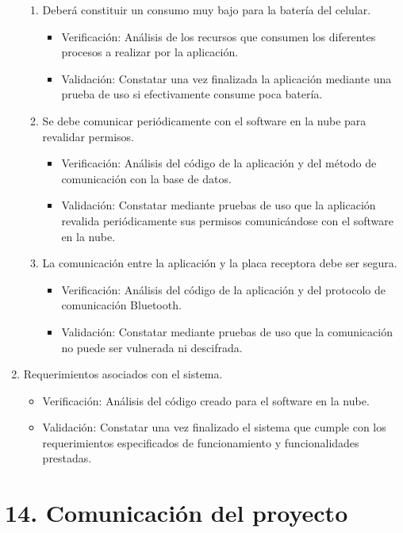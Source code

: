 \documentclass[11pt]{charter}
\begin{document}
\begin{enumerate}
\begin{enumerate}
	\item Deberá constituir un consumo muy bajo para la batería del celular.
		\begin{itemize}
		\item Verificación: Análisis de los recursos que consumen los diferentes procesos a realizar por la aplicación.
		\item Validación: Constatar una vez finalizada la aplicación mediante una prueba de uso si efectivamente consume poca batería.
		\end{itemize}
		
	\item Se debe comunicar periódicamente con el software en la nube para revalidar permisos.
		\begin{itemize}
		\item Verificación: Análisis del código de la aplicación y del método de comunicación con la base de datos.
		\item Validación: Constatar mediante pruebas de uso que la aplicación revalida periódicamente sus permisos comunicándose con el software en la nube.
		\end{itemize}
		
		\item La comunicación entre la aplicación y la placa receptora debe ser segura.
		\begin{itemize}
		\item Verificación: Análisis del código de la aplicación y del protocolo de comunicación Bluetooth.
		\item Validación: Constatar mediante pruebas de uso que la comunicación no puede ser vulnerada ni descifrada.
		\end{itemize}
	\end{enumerate}
	
\item Requerimientos asociados con el sistema.
	\begin{itemize}
	\item Verificación: Análisis del código creado para el software en la nube.
	\item Validación: Constatar una vez finalizado el sistema que cumple con los requerimientos especificados de funcionamiento y funcionalidades prestadas.
	\end{itemize}
	
\end{enumerate}

\newpage

\section{14. Comunicación del proyecto}
\label{sec:comunicaciones}
\end{document}
